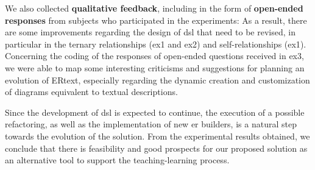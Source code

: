 \item We also collected \textbf{qualitative feedback}, including in the form of \textbf{open-ended responses} from subjects who participated in the experiments:
As a result, there are some improvements regarding the design of \ac{dsl} that need to be revised, in particular in the ternary relationships (\ac{ex1} and \ac{ex2}) and self-relationships (\ac{ex1}).
Concerning the coding of the responses of open-ended questions received in \ac{ex3}, we were able to map some interesting criticisms and suggestions for planning an evolution of ERtext, especially regarding the dynamic creation and customization of diagrams equivalent to textual descriptions.

Since the development of \ac{dsl} is expected to continue, the execution of a possible refactoring, as well as the implementation of new \ac{er} builders, is a natural step towards the evolution of the solution.
From the experimental results obtained, we conclude that there is feasibility and good prospects for our proposed solution as an alternative tool to support the teaching-learning process.




